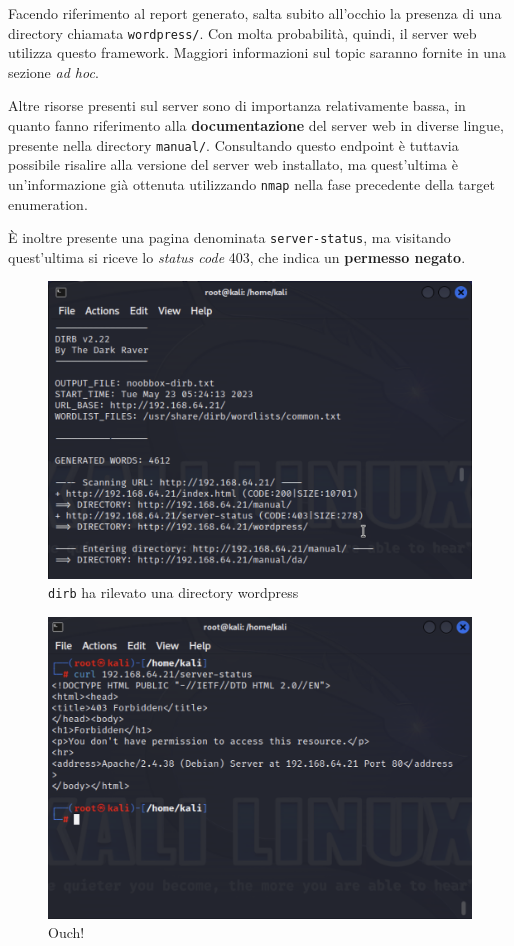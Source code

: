 \documentclass[a4paper, 12pt, oneside]{article}
\begin{document}
Facendo riferimento al report generato, salta subito all'occhio la presenza di una directory chiamata \texttt{wordpress/}. Con molta probabilità, quindi, il server web utilizza questo framework. Maggiori informazioni sul topic saranno fornite in una sezione \textit{ad hoc}.

Altre risorse presenti sul server sono di importanza relativamente bassa, in quanto fanno riferimento alla \textbf{documentazione} del server web in diverse lingue, presente nella directory \texttt{manual/}. Consultando questo endpoint è tuttavia possibile risalire alla versione del server web installato, ma quest'ultima è un'informazione già ottenuta utilizzando \texttt{nmap} nella fase precedente della target enumeration.

È inoltre presente una pagina denominata \texttt{server-status}, ma visitando quest'ultima si riceve lo \textit{status code} 403, che indica un \textbf{permesso negato}.


\begin{figure}[h!]
    \centering
    \includegraphics[width=\textwidth]{img/dirb-output.png}
    \caption{\texttt{dirb} ha rilevato una directory wordpress}
\end{figure}

\begin{figure}[h!]
    \centering
    \includegraphics[width=\textwidth]{img/permission-denied.png}
    \caption{Ouch!}
\end{figure}
\end{document}
